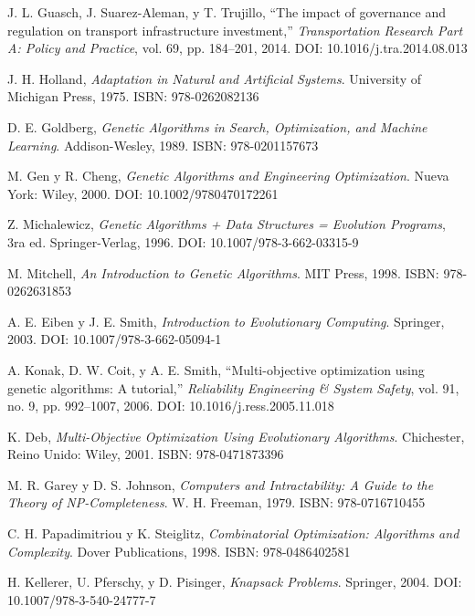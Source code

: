 \documentclass[12pt,a4paper]{article}
\begin{document}
\begin{thebibliography}{45}
J. L. Guasch, J. Suarez-Aleman, y T. Trujillo, ``The impact of governance and regulation on transport infrastructure investment,'' \textit{Transportation Research Part A: Policy and Practice}, vol. 69, pp. 184--201, 2014. DOI: 10.1016/j.tra.2014.08.013

J. H. Holland, \textit{Adaptation in Natural and Artificial Systems}. University of Michigan Press, 1975. ISBN: 978-0262082136

D. E. Goldberg, \textit{Genetic Algorithms in Search, Optimization, and Machine Learning}. Addison-Wesley, 1989. ISBN: 978-0201157673

M. Gen y R. Cheng, \textit{Genetic Algorithms and Engineering Optimization}. Nueva York: Wiley, 2000. DOI: 10.1002/9780470172261

Z. Michalewicz, \textit{Genetic Algorithms + Data Structures = Evolution Programs}, 3ra ed. Springer-Verlag, 1996. DOI: 10.1007/978-3-662-03315-9

M. Mitchell, \textit{An Introduction to Genetic Algorithms}. MIT Press, 1998. ISBN: 978-0262631853

A. E. Eiben y J. E. Smith, \textit{Introduction to Evolutionary Computing}. Springer, 2003. DOI: 10.1007/978-3-662-05094-1

A. Konak, D. W. Coit, y A. E. Smith, ``Multi-objective optimization using genetic algorithms: A tutorial,'' \textit{Reliability Engineering \& System Safety}, vol. 91, no. 9, pp. 992--1007, 2006. DOI: 10.1016/j.ress.2005.11.018

K. Deb, \textit{Multi-Objective Optimization Using Evolutionary Algorithms}. Chichester, Reino Unido: Wiley, 2001. ISBN: 978-0471873396


M. R. Garey y D. S. Johnson, \textit{Computers and Intractability: A Guide to the Theory of NP-Completeness}. W. H. Freeman, 1979. ISBN: 978-0716710455

C. H. Papadimitriou y K. Steiglitz, \textit{Combinatorial Optimization: Algorithms and Complexity}. Dover Publications, 1998. ISBN: 978-0486402581

H. Kellerer, U. Pferschy, y D. Pisinger, \textit{Knapsack Problems}. Springer, 2004. DOI: 10.1007/978-3-540-24777-7



\end{thebibliography}
\end{document}

